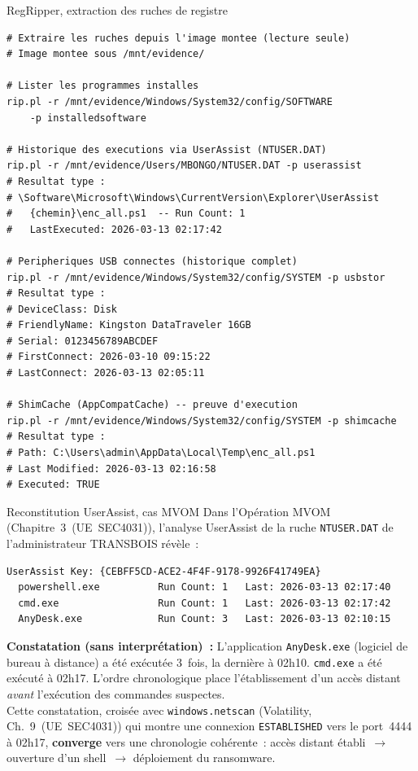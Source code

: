 \begin{boxoutils}{RegRipper, extraction des ruches de registre}
\begin{lstlisting}[language=bash_forensique]
# Extraire les ruches depuis l'image montee (lecture seule)
# Image montee sous /mnt/evidence/

# Lister les programmes installes
rip.pl -r /mnt/evidence/Windows/System32/config/SOFTWARE
    -p installedsoftware

# Historique des executions via UserAssist (NTUSER.DAT)
rip.pl -r /mnt/evidence/Users/MBONGO/NTUSER.DAT -p userassist
# Resultat type :
# \Software\Microsoft\Windows\CurrentVersion\Explorer\UserAssist
#   {chemin}\enc_all.ps1  -- Run Count: 1
#   LastExecuted: 2026-03-13 02:17:42

# Peripheriques USB connectes (historique complet)
rip.pl -r /mnt/evidence/Windows/System32/config/SYSTEM -p usbstor
# Resultat type :
# DeviceClass: Disk
# FriendlyName: Kingston DataTraveler 16GB
# Serial: 0123456789ABCDEF
# FirstConnect: 2026-03-10 09:15:22
# LastConnect: 2026-03-13 02:05:11

# ShimCache (AppCompatCache) -- preuve d'execution
rip.pl -r /mnt/evidence/Windows/System32/config/SYSTEM -p shimcache
# Resultat type :
# Path: C:\Users\admin\AppData\Local\Temp\enc_all.ps1
# Last Modified: 2026-03-13 02:16:58
# Executed: TRUE
\end{lstlisting}
\end{boxoutils}

\begin{boxscenario}{Reconstitution UserAssist, cas MVOM}
Dans l'Opération MVOM (Chapitre~3~(UE~SEC4031)), l'analyse
UserAssist de la ruche \texttt{NTUSER.DAT} de l'administrateur
TRANSBOIS révèle~:

\begin{lstlisting}[language=bash_forensique]
UserAssist Key: {CEBFF5CD-ACE2-4F4F-9178-9926F41749EA}
  powershell.exe          Run Count: 1   Last: 2026-03-13 02:17:40
  cmd.exe                 Run Count: 1   Last: 2026-03-13 02:17:42
  AnyDesk.exe             Run Count: 3   Last: 2026-03-13 02:10:15
\end{lstlisting}

\textbf{Constatation (sans interprétation)~:} L'application
\texttt{AnyDesk.exe} (logiciel de bureau à distance) a été exécutée
3~fois, la dernière à 02h10. \texttt{cmd.exe} a été exécuté à 02h17.
L'ordre chronologique place l'établissement d'un accès distant
\emph{avant} l'exécution des commandes suspectes.\\[0.3ex]
Cette constatation, croisée avec \texttt{windows.netscan} (Volatility,
Ch.~9~(UE~SEC4031)) qui montre une connexion \texttt{ESTABLISHED} vers
le port~4444 à 02h17, \textbf{converge} vers une chronologie cohérente~:
accès distant établi~$\to$ ouverture d'un shell~$\to$ déploiement
du ransomware.
\end{boxscenario}

